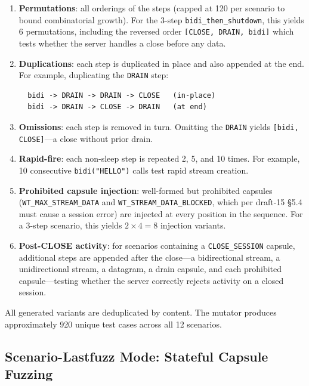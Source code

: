 \begin{enumerate}
    \item \textbf{Permutations}: all orderings of the steps (capped at 120 per scenario to bound combinatorial growth). For the 3-step \texttt{bidi\_then\_shutdown}, this yields 6 permutations, including the reversed order \texttt{[CLOSE, DRAIN, bidi]} which tests whether the server handles a close before any data.

    \item \textbf{Duplications}: each step is duplicated in place and also appended at the end. For example, duplicating the \texttt{DRAIN} step:
\begin{verbatim}
  bidi -> DRAIN -> DRAIN -> CLOSE   (in-place)
  bidi -> DRAIN -> CLOSE -> DRAIN   (at end)
\end{verbatim}

    \item \textbf{Omissions}: each step is removed in turn. Omitting the \texttt{DRAIN} yields \texttt{[bidi, CLOSE]}---a close without prior drain.

    \item \textbf{Rapid-fire}: each non-sleep step is repeated 2, 5, and 10 times. For example, 10 consecutive \texttt{bidi("HELLO")} calls test rapid stream creation.

    \item \textbf{Prohibited capsule injection}: well-formed but prohibited capsules (\texttt{WT\_MAX\-\_STREAM\-\_DATA} and \texttt{WT\_STREAM\-\_DATA\-\_BLOCKED}, which per draft-15 \S5.4 must cause a session error) are injected at every position in the sequence. For a 3-step scenario, this yields $2 \times 4 = 8$ injection variants.

    \item \textbf{Post-CLOSE activity}: for scenarios containing a \texttt{CLOSE\_SESSION} capsule, additional steps are appended after the close---a bidirectional stream, a unidirectional stream, a datagram, a drain capsule, and each prohibited capsule---testing whether the server correctly rejects activity on a closed session.
\end{enumerate}

\noindent All generated variants are deduplicated by content. The mutator produces approximately 920 unique test cases across all 12 scenarios.

\subsection{Scenario-Lastfuzz Mode: Stateful Capsule Fuzzing}

